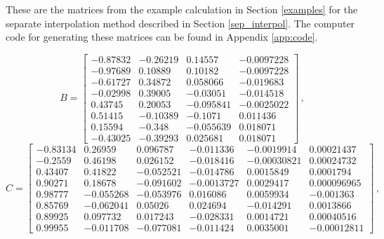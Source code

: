 \label{app:matrices}
These are the matrices from the example calculation in Section \ref{examples} for the separate interpolation method described in Section \ref{sep_interpol}.
The computer code for generating these matrices can be found in Appendix \ref{app:code}.

\vfill
\vfill
\vfill
\begin{equation}
    B = \begin{bmatrix}
        -0.87832 & -0.26219 & 0.14557 & -0.0097228 \\
        -0.97689 & 0.10889 & 0.10182 & -0.0097228 \\
        -0.61727 & 0.34872 & 0.058066 & -0.019683 \\
        -0.02998 & 0.39005 & -0.03051 & -0.014518 \\
        0.43745 & 0.20053 & -0.095841 & -0.0025022 \\
        0.51415 & -0.10389 & -0.1071 & 0.011436 \\
        0.15594 & -0.348 & -0.055639 & 0.018071 \\
        -0.43025 & -0.39293 & 0.025681 & 0.018071
    \end{bmatrix} \,, \nonumber
\end{equation}
\vfill
\begin{equation}
    C = \begin{bmatrix}
        -0.83134 & 0.26959 & 0.096787 & -0.011336 & -0.0019914 & 0.00021437 \\
        -0.2559 & 0.46198 & 0.026152 & -0.018416 & -0.00030821 & 0.00024732 \\
        0.43407 & 0.41822 & -0.052521 & -0.014786 & 0.0015849 & 0.0001794 \\
        0.90271 & 0.18678 & -0.091602 & -0.0013727 & 0.0029417 & 0.000096965 \\
        0.98777 & -0.055268 & -0.053976 & 0.016086 & 0.0059934 & -0.001363 \\
        0.85769 & -0.062041 & 0.05026 & 0.024694 & -0.014291 & 0.0013866 \\
        0.89925 & 0.097732 & 0.017243 & -0.028331 & 0.0014721 & 0.00040516 \\
        0.99955 & -0.011708 & -0.077081 & -0.011424 & 0.0035001 & -0.00012811
    \end{bmatrix}\,,\nonumber
\end{equation}
